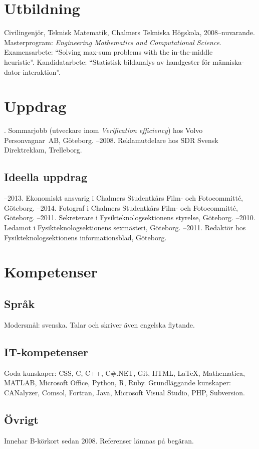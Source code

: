 \documentclass{skvitae}
\author{Simon Sigurdhsson}
\affiliation{}
\begin{document}
	\RaggedRight
	\maketitle

	\section{Utbildning}
	\ind Civilingenjör, Teknisk Matematik, Chalmers Tekniska Högskola, 2008--nuvarande.\\%
		 Masterprogram: \emph{Engineering Mathematics and Computational Science}.\\%
		 Examensarbete: \foreignquote{english}{Solving max-sum problems with the in-the-middle\\heuristic}. %
		 Kandidatarbete: \enquote{Statistisk bildanalys av handgester för människa-dator-interaktion}.

	\section{Uppdrag}
	. Sommarjobb (utveckare inom \emph{Verification efficiency}) hos Volvo Person\-vagnar~AB, Göteborg.
	--2008. Reklamutdelare hos SDR Svensk Direktreklam, Trelleborg.

	\medskip
	\subsection{Ideella uppdrag}
	--2013. Ekonomiskt ansvarig i Chalmers Studentkårs Film- och Fotocommitté, Göteborg.
	--2014. Fotograf i Chalmers Studentkårs Film- och Fotocommitté, Göteborg.
	--2011. Sekreterare i Fysikteknologsektionens styrelse, Göteborg.
	--2010. Ledamot i Fysikteknologsektionens sexmästeri, Göteborg.
	--2011. Redaktör hos Fysikteknologsektionens informationsblad, Göteborg.

	\section{Kompetenser}
	\subsection{Språk}
	\ind Modersmål: svenska. Talar och skriver även engelska flytande.

	\medskip
	\subsection{IT-kompetenser}
	\ind Goda kunskaper: CSS, C, C++, C\#.NET, Git, HTML, \LaTeX, Mathematica, MATLAB, Microsoft Office, Python, R, Ruby.
	\ind Grundläggande kunskaper: CANalyzer, Comsol, Fortran, Java, Microsoft Visual Studio, PHP, Subversion.

	\medskip
	\subsection{Övrigt}
	\ind Innehar B-körkort sedan 2008.
	\ind Referenser lämnas på begäran.
\end{document}
